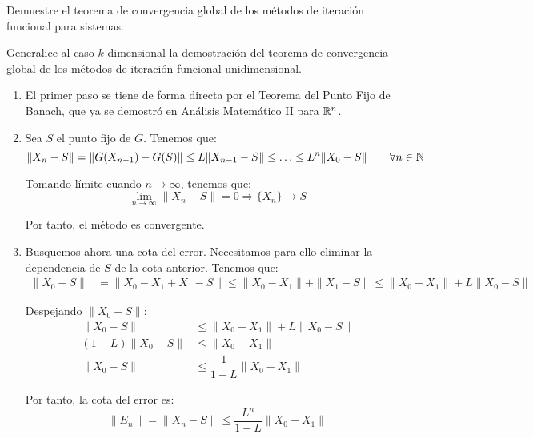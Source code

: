 \begin{ejercicio}\label{ej:1.1.15}
    Demuestre el teorema de convergencia global de los métodos de iteración funcional para sistemas.
    \begin{observacion}
        Generalice al caso $k$-dimensional la demostración del teorema de convergencia global de los métodos de iteración funcional unidimensional.
    \end{observacion}
    \begin{enumerate}
        \item El primer paso se tiene de forma directa por el Teorema del Punto Fijo de Banach, que ya se demostró en Análisis Matemático II para $\mathbb{R}^n$.
        
        \item Sea $S$ el punto fijo de $G$. Tenemos que:
        \begin{equation*}
            \|X_n-S\|=\|G(X_{n-1})-G(S)\|\leq L\|X_{n-1}-S\|\leq \ldots \leq L^n\|X_0-S\|
            \qquad \forall n\in \mathbb{N}
        \end{equation*}

        Tomando límite cuando $n\to\infty$, tenemos que:
        \begin{equation*}
            \lim_{n\to\infty}\|X_n-S\|=0\Longrightarrow \{X_n\}\to S
        \end{equation*}

        Por tanto, el método es convergente.

        \item Busquemos ahora una cota del error. Necesitamos para ello eliminar la dependencia de $S$ de la cota anterior. Tenemos que:
        \begin{align*}
            \|X_0-S\| &= \|X_0-X_1+X_1-S\|\leq \|X_0-X_1\|+\|X_1-S\| \leq \|X_0-X_1\|+L\|X_0-S\|
        \end{align*}

        Despejando $\|X_0-S\|$:
        \begin{align*}
            \|X_0-S\| &\leq \|X_0-X_1\|+L\|X_0-S\|\\
            (1-L)\|X_0-S\| &\leq \|X_0-X_1\|\\
            \|X_0-S\| &\leq \dfrac{1}{1-L}\|X_0-X_1\|
        \end{align*}

        Por tanto, la cota del error es:
        \begin{equation*}
            \|E_n\|=\|X_n-S\|\leq \dfrac{L^n}{1-L}\|X_0-X_1\|
        \end{equation*}
    \end{enumerate}
\end{ejercicio}


